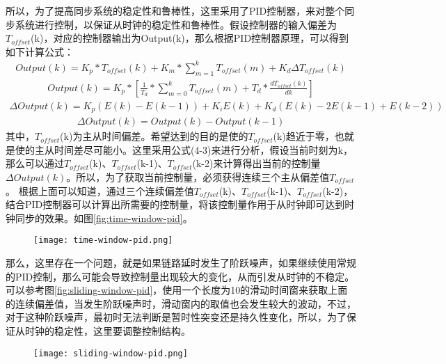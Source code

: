 所以，为了提高同步系统的稳定性和鲁棒性，这里采用了PID控制器，来对整个同步系统进行控制，以保证从时钟的稳定性和鲁棒性。假设控制器的输入偏差为$T_{offset}$(k)，对应的控制器输出为Output(k)，那么根据PID控制器原理，可以得到如下计算公式\supercite{11}：
\begin {align}
Output(k) = K_{p} * T_{offset}(k) + K_{m} * \sum_{m=1}^{k}T_{offset}(m) + K_{d}\Delta T_{offset}(k)
\end{align}
\begin {align}
Output(k) = K_{p} * [\frac{1}{T_{d}} * \sum_{m=0}^{k}T_{offset}(m) + T_{d} * \frac{dT_{offset}(k)}{dk}]
\end{align}
\begin {align}
\Delta Output(k) = K_{p}(E(k) - E(k-1)) + K_{i}E(k) + K_{d}(E(k) - 2E(k-1) + E(k-2))
\end{align}
\begin {align}
\Delta Output(k) = Output(k) - Output(k-1)
\end{align}
其中，$T_{offset}$(k)为主从时间偏差。希望达到的目的是使的$T_{offset}$(k)趋近于零，也就是使的主从时间差尽可能小。这里采用公式(4-3)来进行分析，假设当前时刻为k，那么可以通过$T_{offset}$(k)、$T_{offset}$(k-1)、$T_{offset}$(k-2)来计算得出当前的控制量$\Delta Output(k)$。所以，为了获取当前控制量，必须获得连续三个主从偏差值$T_{offset}$。
根据上面可以知道，通过三个连续偏差值$T_{offset}$(k)、$T_{offset}$(k-1)、$T_{offset}$(k-2)，结合PID控制器可以计算出所需要的控制量，将该控制量作用于从时钟即可达到时钟同步的效果。如图\ref{fig:time-window-pid}。
\begin{figure}[htbp]
  \centering
  \begin{minipage}[b]{0.7\textwidth}
   \captionstyle{\centering}
   \centering
   \texttt{[image: time-window-pid.png]}
  \end{minipage}     
\end{figure}

那么，这里存在一个问题，就是如果链路延时发生了阶跃噪声，如果继续使用常规的PID控制，那么可能会导致控制量出现较大的变化，从而引发从时钟的不稳定。可以参考图\ref{fig:sliding-window-pid}，使用一个长度为10的滑动时间窗来获取上面的连续偏差值，当发生阶跃噪声时，滑动窗内的取值也会发生较大的波动，不过，对于这种阶跃噪声，最初时无法判断是暂时性突变还是持久性变化，所以，为了保证从时钟的稳定性，这里要调整控制结构。

\begin{figure}[htbp]
  \centering
  \begin{minipage}[b]{0.7\textwidth}
   \captionstyle{\centering}
   \centering
   \texttt{[image: sliding-window-pid.png]}
  \end{minipage}     
\end{figure}

